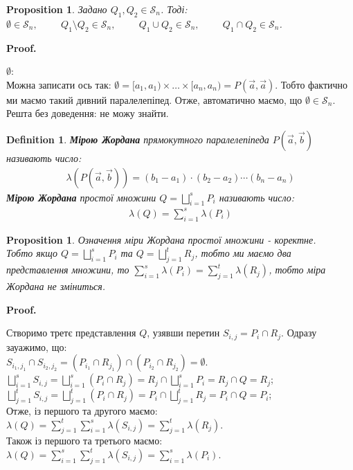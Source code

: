 \documentclass[a4paper, 10pt]{article}
\makeatletter
\def\huge{\displaystyle}
\def\qed{$\blacksquare$}
\theoremstyle{theoremdd}
\theoremstyle{theoremdd}
\newtheorem{definition}[theorem]{Definition}
\theoremstyle{theoremdd}
\theoremstyle{theoremdd}
\theoremstyle{theoremdd}
\newtheorem{proposition}[theorem]{Proposition}
\theoremstyle{theoremdd}
\theoremstyle{theoremdd}
\theoremstyle{theoremdd}
\renewenvironment{proof}[1][Proof.\\]{\par
\pushQED{\hfill \qed}%
\normalfont \topsep6\p@\@plus6\p@\relax
\trivlist
\item\relax
{\bfseries
#1\@addpunct{.}}\hspace\labelsep\ignorespaces
}{%
\popQED\endtrivlist\@endpefalse
}
\makeatother
\begin{document}
\begin{proposition}
Задано $Q_1,Q_2 \in \mathcal{S}_n$. Тоді:\\
$\emptyset \in \mathcal{S}_n, \hspace{1cm} Q_1 \setminus Q_2 \in \mathcal{S}_n, \hspace{1cm} Q_1 \cup Q_2 \in \mathcal{S}_n, \hspace{1cm} Q_1 \cap Q_2 \in \mathcal{S}_n$.
\end{proposition}

\begin{proof}
$\emptyset$:\\
Можна записати ось так: $\emptyset = [a_1,a_1) \times \dots \times [a_n,a_n) = P(\vec{a},\vec{a})$. Тобто фактично ми маємо такий дивний паралелепіпед. Отже, автоматично маємо, що $\emptyset \in \mathcal{S}_n$.
\bigskip \\
Решта без доведення: не можу знайти.
\end{proof}

\begin{definition}
\textbf{Мірою Жордана} прямокутного паралелепіпеда $P(\vec{a},\vec{b})$ називають число:
\begin{align*}
\lambda (P(\vec{a},\vec{b})) = (b_1-a_1)\cdot (b_2-a_2) \cdots (b_n-a_n)
\end{align*}
\textbf{Мірою Жордана} простої множини $Q = \huge\bigsqcup_{i=1}^s P_i$ називають число:
\begin{align*}
\lambda (Q) = \huge\sum_{i=1}^s \lambda (P_i)
\end{align*}
\end{definition}

\begin{proposition}
Означення міри Жордана простої множини - коректне.\\
Тобто якщо $Q = \huge\bigsqcup_{i=1}^s P_i$ та $Q = \huge\bigsqcup_{j=1}^t R_j$, тобто ми маємо два представлення множини, то $\huge\sum_{i=1}^s \lambda (P_i) = \huge\sum_{j=1}^t \lambda (R_j)$, тобто міра Жордана не зміниться.
\end{proposition}

\begin{proof}
Створимо третє представлення $Q$, узявши перетин $S_{i,j} = P_i \cap R_j$. Одразу зауажимо, що:\\
$S_{i_1,j_1} \cap S_{i_2,j_2} = (P_{i_1} \cap R_{j_1}) \cap (P_{i_2} \cap R_{j_2}) = \emptyset$.\\
$\huge\bigsqcup_{i=1}^s S_{i,j} = \bigsqcup_{i=1}^s (P_i \cap R_j) = R_j \cap \bigsqcup_{i=1}^s P_i = R_j \cap Q = R_j$;\\
$\huge\bigsqcup_{j=1}^t S_{i,j} = \bigsqcup_{j=1}^t (P_i \cap R_j) = P_i \cap \bigsqcup_{j=1}^t R_j = P_i \cap Q = P_i$;\\
Отже, із першого та другого маємо: $\lambda (Q) = \huge\sum_{j=1}^t \sum_{i=1}^s \lambda(S_{i,j}) = \sum_{j=1}^t \lambda(R_j)$.\\
Також із першого та третього маємо: $\lambda (Q) = \huge\sum_{i=1}^s \sum_{j=1}^t \lambda(S_{i,j}) = \sum_{i=1}^s \lambda(P_i)$.
\end{proof}
\end{document}
